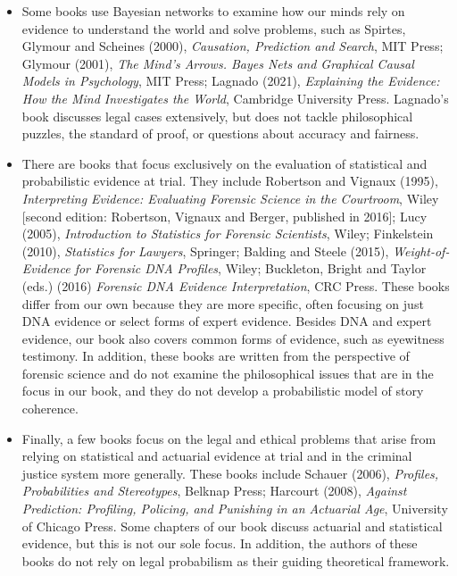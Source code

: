 \documentclass[
  10pt,
  dvipsnames,enabledeprecatedfontcommands]{scrartcl}
\begin{document}
\begin{itemize}
\item Some books use Bayesian networks to examine how our minds rely on evidence to understand the world and solve problems, such as Spirtes, Glymour and Scheines (2000), \emph{Causation, Prediction and Search}, MIT Press; Glymour (2001),  \emph{The Mind's Arrows. Bayes Nets and Graphical Causal Models in Psychology}, MIT Press; Lagnado (2021), \textit{Explaining the Evidence: How the Mind Investigates the World}, Cambridge University Press. Lagnado's book discusses legal cases extensively, but does not tackle philosophical puzzles, the standard of proof, or questions about accuracy and fairness.

\item There are books that focus exclusively on the evaluation of statistical and probabilistic evidence at trial. They include Robertson and Vignaux (1995), \textit{Interpreting Evidence: Evaluating Forensic Science in the Courtroom}, Wiley [second edition:  Robertson, Vignaux and Berger, published in 2016];  Lucy (2005), \textit{Introduction to Statistics for Forensic Scientists}, Wiley;  Finkelstein (2010), \textit{Statistics for Lawyers}, Springer; Balding and Steele (2015), \textit{Weight-of-Evidence for Forensic DNA Profiles}, Wiley;  Buckleton, Bright and Taylor (eds.) (2016) \textit{Forensic DNA Evidence Interpretation}, CRC Press. These books differ from our own because they are more specific, often focusing on just  DNA evidence or select forms of expert evidence. Besides DNA and expert evidence, our book also covers common forms of evidence, such as eyewitness testimony. In addition, these books are written from the perspective of forensic science and do not examine the   philosophical issues that are in the focus in our book, and they do not develop a probabilistic model of story coherence.

\item  Finally, a few books focus on the legal and ethical problems that arise from relying on statistical and actuarial evidence at trial and in the criminal justice system more generally. These books include Schauer (2006), \textit{Profiles, Probabilities and Stereotypes}, Belknap Press; Harcourt (2008), \textit{Against Prediction: Profiling, Policing, and Punishing in an Actuarial Age}, University of Chicago Press. Some chapters of our book discuss  actuarial and statistical evidence, but this is not our sole focus. In addition, the authors of these books do not rely on legal probabilism as their guiding theoretical framework.


\end{itemize}
\end{document}
